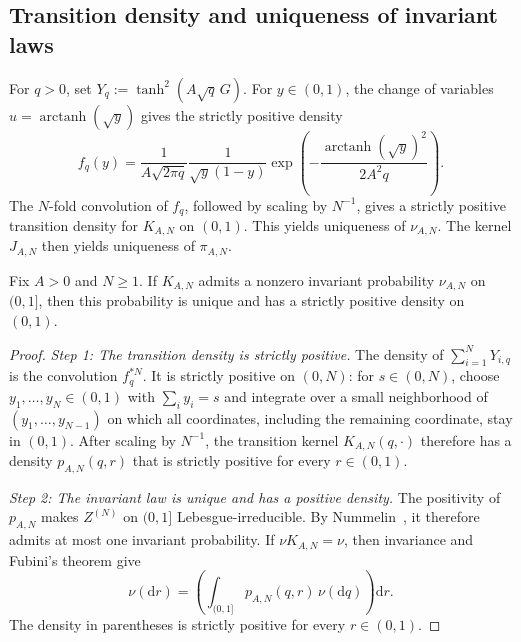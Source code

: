 \documentclass[11pt,reqno,a4paper]{article}
\DeclareMathOperator{\arctanh}{arctanh}
\begin{document}
\subsection{Transition density and uniqueness of invariant laws}
\label{subsec:gaussian-exact-radius-chain}

For $q>0$, set $Y_q:=\tanh^2(A\sqrt q\,G)$. For $y\in(0,1)$, the change of
variables $u=\arctanh(\sqrt y)$ gives the strictly positive density
\begin{equation}\label{eq:gaussian-one-coordinate-density}
  f_q(y)
  =
  \frac{1}{A\sqrt{2\pi q}}
  \frac{1}{\sqrt y(1-y)}
  \exp\left(
    -\frac{\arctanh(\sqrt y)^2}{2A^2q}
  \right).
\end{equation}
The $N$-fold convolution of $f_q$, followed by scaling by $N^{-1}$, gives a
strictly positive transition density for $K_{A,N}$ on $(0,1)$. This yields
uniqueness of $\nu_{A,N}$. The kernel $J_{A,N}$ then yields uniqueness of
$\pi_{A,N}$.
\begin{proposition}
\label{prop:gaussian-unique-nonzero-invariant}
  Fix $A>0$ and $N\geq1$. If $K_{A,N}$ admits a nonzero invariant probability
  $\nu_{A,N}$ on $(0,1]$, then this probability is unique and has a strictly
  positive density on $(0,1)$.
\end{proposition}

\begin{proof}
  \emph{Step 1: The transition density is strictly positive.}
  The density of $\sum_{i=1}^N Y_{i,q}$ is the convolution
  $f_q^{\ast N}$. It is strictly positive on $(0,N)$: for $s\in(0,N)$,
  choose $y_1,\ldots,y_N\in(0,1)$ with $\sum_i y_i=s$ and integrate over a
  small neighborhood of $(y_1,\ldots,y_{N-1})$ on which all coordinates,
  including the remaining coordinate, stay in $(0,1)$. After scaling by
  $N^{-1}$, the transition kernel $K_{A,N}(q,\cdot)$ therefore has a density
  $p_{A,N}(q,r)$ that is strictly positive for every $r\in(0,1)$.

  \emph{Step 2: The invariant law is unique and has a positive density.}
  The positivity of $p_{A,N}$ makes $Z^{(N)}$ on $(0,1]$
  Lebesgue-irreducible. By Nummelin~\cite{nummelin1984}, it therefore admits at
  most one invariant probability. If $\nu K_{A,N}=\nu$, then invariance and
  Fubini's theorem give
  \begin{equation*}
    \nu(\mathrm{d}r)
    =
    \left(
      \int_{(0,1]}p_{A,N}(q,r)\,\nu(\mathrm{d}q)
    \right)\mathrm{d}r.
  \end{equation*}
  The density in parentheses is strictly positive for every $r\in(0,1)$.
\end{proof}
\end{document}
